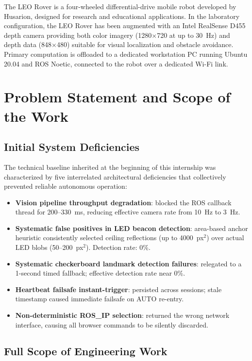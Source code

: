 The LEO Rover is a four-wheeled differential-drive mobile robot developed by Husarion, designed for research and educational applications. In the laboratory configuration, the LEO Rover has been augmented with an Intel RealSense D455 depth camera providing both color imagery (1280$\times$720 at up to 30~Hz) and depth data (848$\times$480) suitable for visual localization and obstacle avoidance. Primary computation is offloaded to a dedicated workstation PC running Ubuntu 20.04 and ROS Noetic, connected to the robot over a dedicated Wi-Fi link.

\section{Problem Statement and Scope of the Work}

\subsection{Initial System Deficiencies}

The technical baseline inherited at the beginning of this internship was characterized by five interrelated architectural deficiencies that collectively prevented reliable autonomous operation:

\begin{itemize}[leftmargin=1.4em]
  \item \textbf{Vision pipeline throughput degradation}:  blocked the ROS callback thread for 200--330~ms, reducing effective camera rate from 10~Hz to 3~Hz.
  \item \textbf{Systematic false positives in LED beacon detection}: area-based anchor heuristic consistently selected ceiling reflections (up to 4000~px$^2$) over actual LED blobs (50--200~px$^2$). Detection rate: 0\%.
  \item \textbf{Systematic checkerboard landmark detection failures}:  relegated to a 1-second timed fallback; effective detection rate near 0\%.
  \item \textbf{Heartbeat failsafe instant-trigger}:  persisted across sessions; stale timestamp caused immediate failsafe on AUTO re-entry.
  \item \textbf{Non-deterministic ROS\_IP selection}:  returned the wrong network interface, causing all browser commands to be silently discarded.
\end{itemize}

\subsection{Full Scope of Engineering Work}

